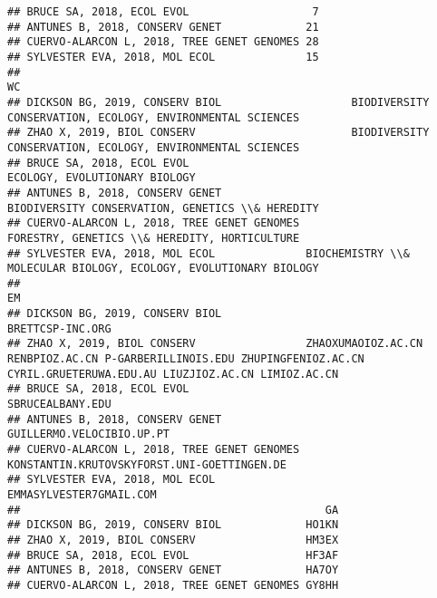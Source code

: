 \documentclass[]{article}
\begin{document}
\begin{verbatim}
## BRUCE SA, 2018, ECOL EVOL                   7
## ANTUNES B, 2018, CONSERV GENET             21
## CUERVO-ALARCON L, 2018, TREE GENET GENOMES 28
## SYLVESTER EVA, 2018, MOL ECOL              15
##                                                                                                           WC
## DICKSON BG, 2019, CONSERV BIOL                    BIODIVERSITY CONSERVATION, ECOLOGY, ENVIRONMENTAL SCIENCES
## ZHAO X, 2019, BIOL CONSERV                        BIODIVERSITY CONSERVATION, ECOLOGY, ENVIRONMENTAL SCIENCES
## BRUCE SA, 2018, ECOL EVOL                                                      ECOLOGY, EVOLUTIONARY BIOLOGY
## ANTUNES B, 2018, CONSERV GENET                              BIODIVERSITY CONSERVATION, GENETICS \\& HEREDITY
## CUERVO-ALARCON L, 2018, TREE GENET GENOMES                     FORESTRY, GENETICS \\& HEREDITY, HORTICULTURE
## SYLVESTER EVA, 2018, MOL ECOL              BIOCHEMISTRY \\& MOLECULAR BIOLOGY, ECOLOGY, EVOLUTIONARY BIOLOGY
##                                                                                                                                                                        EM
## DICKSON BG, 2019, CONSERV BIOL                                                                                                                           BRETTCSP-INC.ORG
## ZHAO X, 2019, BIOL CONSERV                 ZHAOXUMAOIOZ.AC.CN RENBPIOZ.AC.CN P-GARBERILLINOIS.EDU ZHUPINGFENIOZ.AC.CN CYRIL.GRUETERUWA.EDU.AU LIUZJIOZ.AC.CN LIMIOZ.AC.CN
## BRUCE SA, 2018, ECOL EVOL                                                                                                                                SBRUCEALBANY.EDU
## ANTUNES B, 2018, CONSERV GENET                                                                                                                  GUILLERMO.VELOCIBIO.UP.PT
## CUERVO-ALARCON L, 2018, TREE GENET GENOMES                                                                                    KONSTANTIN.KRUTOVSKYFORST.UNI-GOETTINGEN.DE
## SYLVESTER EVA, 2018, MOL ECOL                                                                                                                     EMMASYLVESTER7GMAIL.COM
##                                               GA
## DICKSON BG, 2019, CONSERV BIOL             HO1KN
## ZHAO X, 2019, BIOL CONSERV                 HM3EX
## BRUCE SA, 2018, ECOL EVOL                  HF3AF
## ANTUNES B, 2018, CONSERV GENET             HA7OY
## CUERVO-ALARCON L, 2018, TREE GENET GENOMES GY8HH

\end{verbatim}
\end{document}
